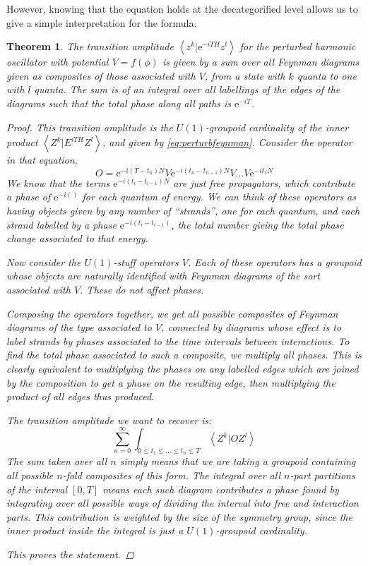 \documentclass{amsart} \usepackage{amsmath,amssymb,bbm}
\newcommand{\inprod}[1]{\left\langle{#1}\right\rangle}
\newtheorem{theorem}{Theorem}
\newcommand{\mathe}{\mathrm{e}}
\begin{document}
However, knowing that the equation holds at the decategorified level
allows us to give a simple interpretation for the formula.

\begin{theorem} The transition amplitude
$\inprod{z^k|\mathe^{-iTH}z^l}$ for the perturbed harmonic oscillator
with potential $V=f(\phi)$ is given by a sum over all Feynman diagrams
given as composites of those associated with $V$, from a state with
$k$ quanta to one with $l$ quanta.  The sum is of an integral over all
labellings of the edges of the diagrams such that the total phase
along all paths is $\mathe^{-iT}$.
\begin{proof}
This transition amplitude is the $U(1)$-groupoid cardinality of the
inner product $\inprod{Z^k|E^{iTH}Z^l}$, and given by
\ref{eq:perturbfeynman}.  Consider the operator in that equation,
\[
O=\mathe^{-i(T-t_n)N}V\mathe^{-i(t_n-t_{n-1})N}V \dots V\mathe^{-it_1N}
\]
We know that the terms $\mathe^{-i(t_i-t_{i-1})N}$ are just free
propagators, which contribute a phase of $\mathe^{-i()}$ for each
quantum of energy.  We can think of these operators as having objects
given by any number of ``strands'', one for each quantum, and each
strand labelled by a phase $\mathe^{-i(t_i-t_{i-1})}$, the total
number giving the total phase change associated to that energy.

Now consider the $U(1)$-stuff operators $V$.  Each of these operators
has a groupoid whose objects are naturally identified with Feynman
diagrams of the sort associated with $V$.  These do not affect phases.

Composing the operators together, we get all possible composites of
Feynman diagrams of the type associated to $V$, connected by diagrams
whose effect is to label strands by phases associated to the time
intervals between interactions.  To find the total phase associated to
such a composite, we multiply all phases.  This is clearly equivalent
to multiplying the phases on any labelled edges which are joined by
the composition to get a phase on the resulting edge, then multiplying
the product of all edges thus produced.

The transition amplitude we want to recover is:
\[
\sum_{n=0}^{\infty} \int_{0 \leq t_1 \leq \dots \leq t_n \leq T} \inprod{Z^k|O Z^l}
\]
The sum taken over all $n$ simply means that we are taking a groupoid
containing all possible $n$-fold composites of this form.  The
integral over all $n$-part partitions of the interval $[0,T]$ means
each such diagram contributes a phase found by integrating over all
possible ways of dividing the interval into free and interaction
parts.  This contribution is weighted by the size of the symmetry
group, since the inner product inside the integral is just a
$U(1)$-groupoid cardinality.

This proves the statement.
\end{proof}
\end{theorem}
\end{document}
